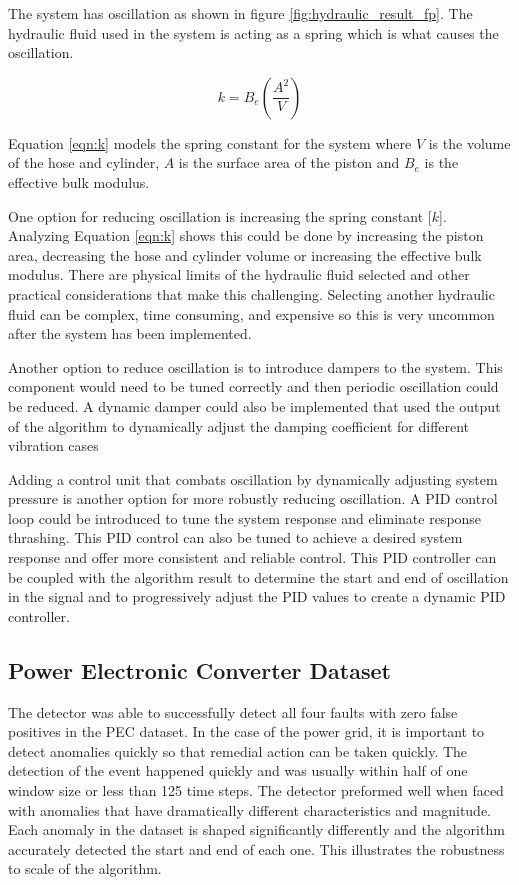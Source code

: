 The system has oscillation as shown in figure \ref{fig:hydraulic_result_fp}. The hydraulic fluid used in the system is acting as a spring which is what causes the oscillation. 

\begin{equation}
    k = B_e \left ( \frac{A^2}{V} \right)
    \label{eqn:k}
\end{equation}

Equation \eqref{eqn:k} models the spring constant for the system where $V$ is the volume of the hose and cylinder, $A$ is the surface area of the piston and $B_e$ is the effective bulk modulus. 

One option for reducing oscillation is increasing the spring constant [$k$]. Analyzing Equation \eqref{eqn:k} shows this could be done by increasing the piston area, decreasing the hose and cylinder volume or increasing the effective bulk modulus. There are physical limits of the hydraulic fluid selected and other practical considerations that make this challenging. Selecting another hydraulic fluid can be complex, time consuming, and expensive so this is very uncommon after the system has been implemented. 

Another option to reduce oscillation is to introduce dampers to the system. This component would need to be tuned correctly and then periodic oscillation could be reduced. A dynamic damper could also be implemented that used the output of the algorithm to dynamically adjust the damping coefficient for different vibration cases 

Adding a control unit that combats oscillation by dynamically adjusting system pressure is another option for more robustly reducing oscillation. A PID control loop could be introduced to tune the system response and eliminate response thrashing. This PID control can also be tuned to achieve a desired system response and offer more consistent and reliable control. This PID controller can be coupled with the algorithm result to determine the start and end of oscillation in the signal and to progressively adjust the PID values to create a dynamic PID controller.


\subsection{Power Electronic Converter Dataset}

The detector was able to successfully detect all four faults with zero false positives in the PEC dataset. In the case of the power grid, it is important to detect anomalies quickly so that remedial action can be taken quickly.  The detection of the event happened quickly and was usually within half of one window size or less than 125 time steps. The detector preformed well when faced with anomalies that have dramatically different characteristics and magnitude. Each anomaly in the dataset is shaped significantly differently and the algorithm accurately detected the start and end of each one. This illustrates the robustness to scale of the algorithm.

